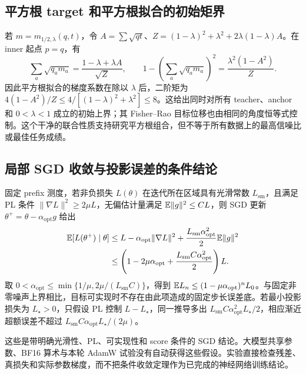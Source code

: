 \subsection{平方根 target 和平方根拟合的初始矩界}

若 $m=m_{1/2,\lambda}(q,t)$，令 $A=\sum\sqrt{qt}$、$Z=(1-\lambda)^2+\lambda^2+2\lambda(1-\lambda)A$。在 inner 起点 $p=q$，有
\begin{equation}
 \sum_a\sqrt{q_am_a}=\frac{1-\lambda+\lambda A}{\sqrt Z},\qquad
 1-\left(\sum_a\sqrt{q_am_a}\right)^2=\frac{\lambda^2(1-A^2)}Z.
\end{equation}
因此平方根拟合的梯度系数在除以 $\lambda$ 后，二阶矩为 $4(1-A^2)/Z\le4/[(1-\lambda)^2+\lambda^2]\le8$。这给出同时对所有 teacher、anchor 和 $0<\lambda<1$ 成立的初始上界；其 Fisher--Rao 目标位移也由相同的角度恒等式控制。这个干净的联合性质支持研究平方根组合，但不等于所有数据上的最高信噪比或最佳任务成绩。

\subsection{局部 SGD 收敛与投影误差的条件结论}

固定 prefix 测度，若非负损失 $L(\theta)$ 在迭代所在区域具有光滑常数 $L_{\mathrm{sm}}$，且满足 PL 条件 $\|\nabla L\|^2\ge2\mu L$，无偏估计量满足 $\mathbb E\|g\|^2\le CL$，则 SGD 更新 $\theta^+=\theta-\alpha_{\mathrm{opt}}g$ 给出
\begin{align}
 \mathbb E[L(\theta^+)\mid\theta]
 &\le L-\alpha_{\mathrm{opt}}\|\nabla L\|^2+
 \frac{L_{\mathrm{sm}}\alpha_{\mathrm{opt}}^2}2\mathbb E\|g\|^2\\
 &\le\left(1-2\mu\alpha_{\mathrm{opt}}+
 \frac{L_{\mathrm{sm}}C\alpha_{\mathrm{opt}}^2}2\right)L.
\end{align}
取 $0<\alpha_{\mathrm{opt}}\le\min\{1/\mu,2\mu/(L_{\mathrm{sm}}C)\}$，得到 $\mathbb E L_n\le(1-\mu\alpha_{\mathrm{opt}})^nL_0$。与固定非零噪声上界相比，目标可实现时不存在由此项造成的固定步长误差底。若最小投影损失为 $L_\star>0$，只假设 PL 控制 $L-L_\star$，同一推导多出 $L_{\mathrm{sm}}C\alpha_{\mathrm{opt}}^2L_\star/2$，相应渐近超额误差不超过 $L_{\mathrm{sm}}C\alpha_{\mathrm{opt}}L_\star/(2\mu)$。

这些是带明确光滑性、PL、可实现性和 score 条件的 SGD 结论。大模型共享参数、BF16 算术与本轮 AdamW 试验没有自动获得这些假设。实验直接检查残差、真损失和实际参数梯度，而不把条件收敛定理作为已完成的神经网络训练结论。
